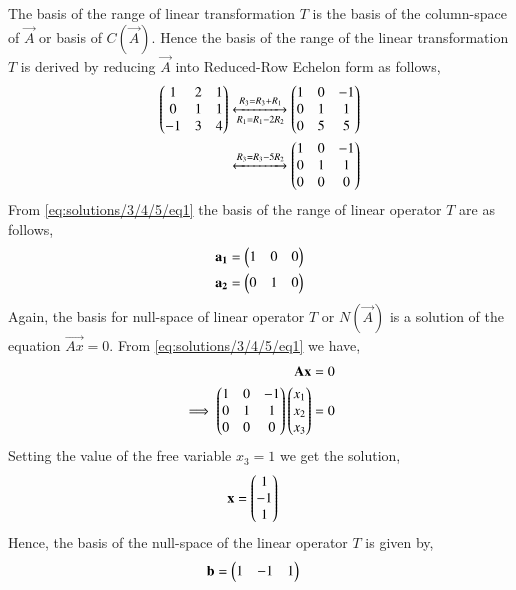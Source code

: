 The basis of the range of linear transformation $T$ is the basis of the column-space of $\vec{A}$ or basis of $C(\vec{A})$. Hence the basis of the range of the linear transformation $T$ is derived by reducing $\vec{A}$ into Reduced-Row Echelon form as follows,
\begin{align}
\begin{pmatrix}1&2&1\\0&1&1\\-1&3&4\end{pmatrix}&\xleftrightarrow[R_1=R_1-2R_2]{R_3=R_3+R_1}\begin{pmatrix}1&0&-1\\0&1&1\\0&5&5\end{pmatrix}\\
&\xleftrightarrow{R_3=R_3-5R_2}\begin{pmatrix}1&0&-1\\0&1&1\\0&0&0\end{pmatrix}\label{eq:solutions/3/4/5/eq1}
\end{align}
From \eqref{eq:solutions/3/4/5/eq1} the basis of the range of linear operator $T$ are as follows,
\begin{align}
\mathbf{a_1} &= \begin{pmatrix}1&0&0\end{pmatrix}\\
\mathbf{a_2} &= \begin{pmatrix}0&1&0\end{pmatrix}
\end{align}
Again, the basis for null-space of linear operator $T$ or $N(\vec{A})$ is a solution of the equation $\vec{Ax} = 0$. From \eqref{eq:solutions/3/4/5/eq1} we have,
\begin{align}
\mathbf{Ax} &= 0\\
\implies\begin{pmatrix}1&0&-1\\0&1&1\\0&0&0\end{pmatrix}\begin{pmatrix}x_1\\x_2\\x_3\end{pmatrix} &= 0 \label{eq:solutions/3/4/5/eq2}
\end{align}
Setting the value of the free variable $x_3 = 1$ we get the solution,
\begin{align}
\mathbf{x} &= \begin{pmatrix}1\\-1\\1\end{pmatrix}
\end{align}
Hence, the basis of the null-space of the linear operator $T$ is given by,
\begin{align}
\mathbf{b} &= \begin{pmatrix}1&-1&1\end{pmatrix}
\end{align}
